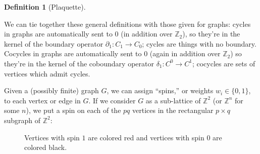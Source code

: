 \documentclass[11pt]{article}
\theoremstyle{definition}
\newtheorem*{definition*}{Definition}
\newcommand{\Z}{\mathbb{Z}}			%
\begin{document}
		\begin{definition*}[Plaquette]
				
		\end{definition*}


		We can tie together these general definitions with those given for graphs: cycles in graphs are automatically sent to $0$ (in addition over $\Z_2$), so they're in the kernel of the boundary operator $\partial_1: C_1 \to C_0$; cycles are things with no boundary. Cocycles in graphs are automatically sent to $0$ (again in addition over $\Z_2$) so they're in the kernel of the coboundary operator $\delta_1: C^0 \to C^1$; cocycles are sets of vertices which admit cycles.
			
		Given a (possibly finite) graph $G$, we can assign ``spins,'' or weights $w_i \in \{0,1\}$, to each vertex or edge in $G$. If we consider $G$ as a sub-lattice of $\Z^2$ (or $\Z^n$ for some $n$), we put a spin on each of the $pq$ vertices in the rectangular $p \times q$ subgraph of $\Z^2$:
		
		\begin{figure*}[htpb!]
			
			\begin{center}
			\end{center}
			\caption{
				Vertices with spin $1$ are colored {\color{bured}red} and vertices with spin $0$ are colored black.
			}
		\end{figure*}
		
\end{document}
